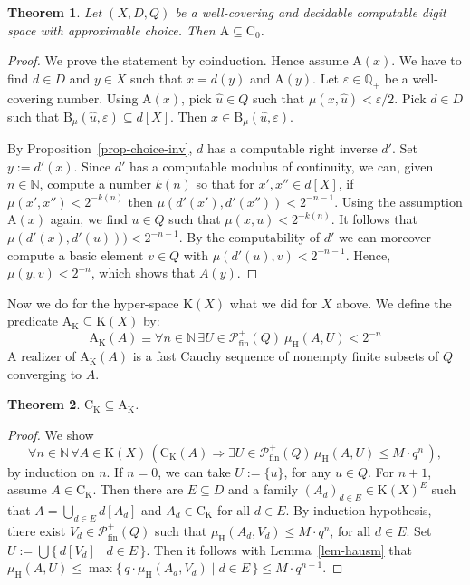 \documentclass[microtype]{jloganal}
\theoremstyle{plain}
\newtheorem{theorem}{Theorem}[section]
\theoremstyle{definition}
\newcommand{\NN}{\mathbb{N}}
\newcommand{\QQ}{\mathbb{Q}}
\newcommand{\ball}[3]{\mathrm{B}_{#1}(#2,#3)}
\newcommand{\coco}{\mathrm{C}}
\newcommand{\compact}{\mathrm{K}}
\newcommand{\hdm}{\mu_{\mathrm H}}
\newcommand{\powfin}{\mathcal{P}^+_{\mathrm{fin}}}
\newcommand{\cauchy}{\mathrm{A}}
\begin{document}
\begin{theorem}
\label{thm-a-sub-c}
Let $(X,D,Q)$ be a well-covering and decidable computable digit space with approximable choice.
Then $\cauchy \subseteq \coco_0$.
\end{theorem}
\begin{proof}
We prove the statement by coinduction. Hence assume $\cauchy(x)$.
We have to find $d\in D$ and $y\in X$ such that $x=d(y)$ and $\cauchy(y)$.
Let $\varepsilon \in \QQ_+$ be a well-covering number.
Using $\cauchy(x)$,  
pick $\hat{u}\in Q$ such that $\mu(x,\hat{u}) < \varepsilon/2$.
Pick $d\in D$ such that $\ball{\mu}{\hat{u}}{\varepsilon}\subseteq d[X]$. 
Then $x \in \ball{\mu}{\hat{u}}{\varepsilon}$. 

By Proposition~\ref{prop-choice-inv}, $d$ has a computable right inverse $d'$. 
Set $y := d'(x)$. Since $d'$ has a computable modulus of continuity, we can, 
given $n \in \NN$, compute a number $k(n)$ so that for $x', x'' \in d[X]$, 
if $\mu(x', x'') < 2^{-k(n)}$ then $\mu(d'(x'), d'(x'')) < 2^{-n-1}$. 
Using the assumption $\cauchy(x)$ again, we find $u\in Q$ such that
$\mu(x,u)< 2^{-k(n)}$.
It follows that $\mu(d'(x), d'(u))) < 2^{-n-1}$. By the computability 
of $d'$ we can moreover compute a basic element $v \in Q$ with 
$\mu(d'(u), v) < 2^{-n-1}$. 
Hence, $\mu(y, v) < 2^{-n}$, which shows that $A(y)$.
\end{proof}

Now we do for the hyper-space $\compact(X)$ what we did for $X$ above.
We define the predicate $\cauchy_\compact\subseteq \compact(X)$ by:
\[ \cauchy_\compact(A) \equiv 
   \forall n\in\NN\,\exists U\in \powfin(Q)\ \hdm(A,U) < 2^{-n} \]
A realizer of $\cauchy_\compact(A)$ is a fast Cauchy sequence of nonempty 
finite subsets of $Q$ converging to $A$.

\begin{theorem}
\label{thm-ck-sub-ak}
$\coco_\compact \subseteq \cauchy_\compact$.
\end{theorem}
\begin{proof}
We show 
\[
\forall n\in\NN\,\forall A\in \compact(X)\,(\coco_\compact(A) \Rightarrow 
  \exists U\in \powfin(Q)\,\hdm(A,U) \le M \cdot q^n\,),
  \]
by induction on $n$.
If $n=0$, we can take $U := \{u\}$, for any $u \in Q$.
For $n+1$, assume $A\in\coco_\compact$. Then there are 
$E \subseteq D$ and a family $(A_d)_{d\in E} \in \compact(X)^E$
such that $A = \bigcup_{d\in E} d[A_d]$ and $A_d\in\coco_{\compact}$ for
all $d\in E$.
By induction hypothesis,
there exist $V_d\in \powfin(Q)$ such that $\hdm(A_d,V_d)\le M\cdot q^{n}$,
for all $d\in E$. Set $U := \bigcup\{\,d[V_d] \mid d\in E\,\}$. 
Then it follows with Lemma~\ref{lem-hausm} that $\hdm(A,U) \le \max\{\,q\cdot\hdm(A_d,V_d)\mid d\in E\,\} 
\le M\cdot q^{n+1}$. 
\end{proof}
\end{document}
